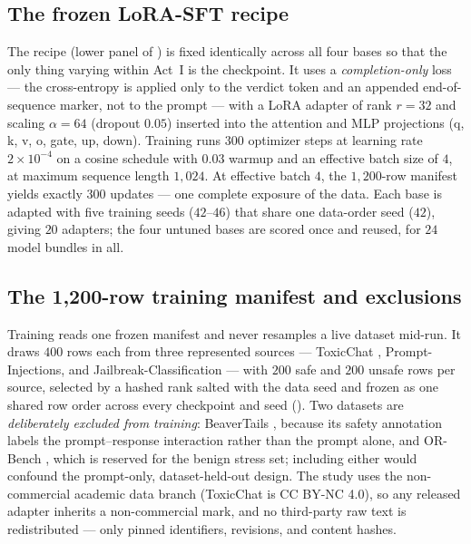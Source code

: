 \subsection{The frozen LoRA-SFT recipe}
\label{sec:setup-recipe}

The recipe (lower panel of ) is fixed identically across all four bases so that
the only thing varying within Act~I is the checkpoint. It uses a \emph{completion-only} loss --- the
cross-entropy is applied only to the verdict token and an appended end-of-sequence marker, not to the
prompt --- with a LoRA adapter of rank $r{=}32$ and scaling $\alpha{=}64$ (dropout $0.05$) inserted into
the attention and MLP projections (q, k, v, o, gate, up, down). Training runs $300$ optimizer steps at
learning rate $2\times10^{-4}$ on a cosine schedule with $0.03$ warmup and an effective batch size of
$4$, at maximum sequence length $1{,}024$. At effective batch $4$, the $1{,}200$-row manifest yields
exactly $300$ updates --- one complete exposure of the data. Each base is adapted with five training
seeds ($42$--$46$) that share one data-order seed ($42$), giving $20$ adapters; the four untuned bases
are scored once and reused, for $24$ model bundles in all.

\subsection{The 1,200-row training manifest and exclusions}
\label{sec:setup-manifest}

Training reads one frozen manifest and never resamples a live dataset mid-run. It draws $400$ rows each
from three represented sources --- ToxicChat \citep{lin2023toxicchat}, Prompt-Injections, and
Jailbreak-Classification --- with $200$ safe and $200$ unsafe rows per source, selected by a hashed rank
salted with the data seed and frozen as one shared row order across every checkpoint and seed
(). Two datasets are \emph{deliberately excluded from training}: BeaverTails
\citep{ji2023beavertails}, because its safety annotation labels the prompt--response interaction rather
than the prompt alone, and OR-Bench \citep{cui2024orbench}, which is reserved for the benign stress set;
including either would confound the prompt-only, dataset-held-out design. The study uses the
non-commercial academic data branch (ToxicChat is CC BY-NC 4.0), so any released adapter inherits a
non-commercial mark, and no third-party raw text is redistributed --- only pinned identifiers,
revisions, and content hashes.

